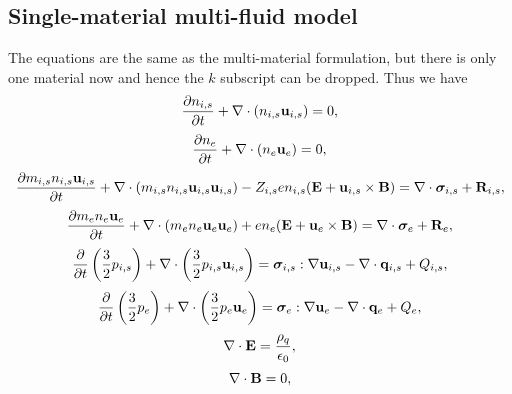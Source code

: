 \documentclass[a4paper,11pt]{report}
\begin{document}
\subsection{Single-material multi-fluid model}
\label{sec:mf_np1fluid_equations}
The equations are the same as the multi-material formulation, but there is only one material now and hence the $k$ subscript can be dropped. Thus we have 
\begin{equation}
    \label{eq:mf_np1fluid_ni}
    \frac{\partial n_{i,s}}{\partial t} + \nabla \cdot \left ( n_{i,s} \mathbf{u}_{i,s} \right ) = 0,
\end{equation}
\begin{equation}
    \label{eq:mf_np1fluid_ne}
    \frac{\partial n_e}{\partial t} + \nabla \cdot \left ( n_e \mathbf{u}_e \right ) = 0,
\end{equation}
\begin{equation}
    \label{eq:mf_np1fluid_ui}
    \frac{\partial m_{i,s} n_{i,s} \mathbf{u}_{i,s}}{\partial t} + \nabla \cdot \left( m_{i,s} n_{i,s} \mathbf{u}_{i,s} \mathbf{u}_{i,s} \right) - Z_{i,s} e n_{i,s} ( \mathbf{E} + \mathbf{u}_{i,s} \times \mathbf{B} ) = \nabla \cdot \bm \sigma_{i,s} + \mathbf{R}_{i,s},
\end{equation}
\begin{equation}
    \label{eq:mf_np1fluid_ue}
    \frac{\partial m_e n_e \mathbf{u}_e}{\partial t} + \nabla \cdot \left ( m_e n_e \mathbf{u}_e \mathbf{u}_e \right) + e n_e ( \mathbf{E} + \mathbf{u}_e \times \mathbf{B} ) = \nabla \cdot \bm \sigma_e + \mathbf{R}_e,
\end{equation}
\begin{equation}
    \label{eq:mf_np1fluid_iei}
    \frac{\partial}{\partial t} \left ( \frac{3}{2} p_{i,s} \right ) + \nabla \cdot \left ( \frac{3}{2} p_{i,s} \mathbf{u}_{i,s} \right ) = \bm \sigma_{i,s} : \nabla \mathbf{u}_{i,s} - \nabla \cdot \mathbf{q}_{i,s} + Q_{i,s},
\end{equation}
\begin{equation}
    \label{eq:mf_np1fluid_iee}
    \frac{\partial}{\partial t} \left ( \frac{3}{2} p_e \right ) + \nabla \cdot \left ( \frac{3}{2} p_e \mathbf{u}_e \right ) = \bm \sigma_e : \nabla \mathbf{u}_e - \nabla \cdot \mathbf{q}_e + Q_e,
\end{equation}
\begin{equation}
    \label{eq:mf_np1fluid_maxwell_3}
    \nabla \cdot \mathbf{E} = \frac{\rho_q}{\epsilon_0},
\end{equation}
\begin{equation}
    \label{eq:mf_np1fluid_maxwell_4}
    \nabla \cdot \mathbf{B} = 0,
\end{equation}
\end{document}

